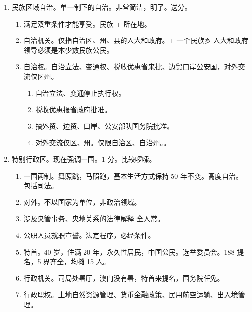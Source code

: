 \begin{enumerate}
\begin{enumerate}
          \item 国徽。\sjt 标准版本。中国人大网和国务院网。
                \begin{enumerate}
                  \item 五星照耀天安门，周围谷穗和齿轮。
                  \item 各级人常、政府、监察委、国务院驻港澳。线上线下同步挂。
                \end{enumerate}
        \end{enumerate}
  \item 民族区域自治。单一制下的自治。非常简洁，明了。送分。
        \begin{enumerate}
          \item 满足双重条件才能享受。民族 + 所在地。
          \item 自治机关。仅指自治区、州、县的人大和政府。+ 一个民族乡 \yjt 人大和政府领导必须是本少数民族公民。
          \item 自治权。自治立法、变通权、税收优惠省来批、边贸口岸公安国，对外交流仅区州。
                \begin{enumerate}
                  \item 自治立法、变通停止执行权。
                  \item 税收优惠报省政府批准。
                  \item 搞外贸、边贸、口岸、公安部队国务院批准。
                  \item 对外交流仅区、州。仅限自治区、自治州。。
                \end{enumerate}
        \end{enumerate}
  \item 特别行政区。现在强调一国。1 分。比较啰嗦。
        \begin{enumerate}
          \item 一国两制。舞照跳，马照跑，基本生活方式保持 50 年不变。高度自治。包括司法。
          \item 对外。不以国家为单位，非政治领域。
          \item 涉及央管事务、央地关系的法律解释 \yjt 全人常。
          \item 公职人员就职宣誓。法定程序，必经条件。
          \item 特首。40 岁，住满 20 年，永久性居民，中国公民。选举委员会。188 提名，5 界齐全，均摊 15 人。
          \item 行政机关。司局处署厅，澳门没有署，特首来提名，国务院任免。
          \item 行政职权。土地自然资源管理、货币金融政策、民用航空运输、出入境管理。

\end{enumerate}
\end{enumerate}
